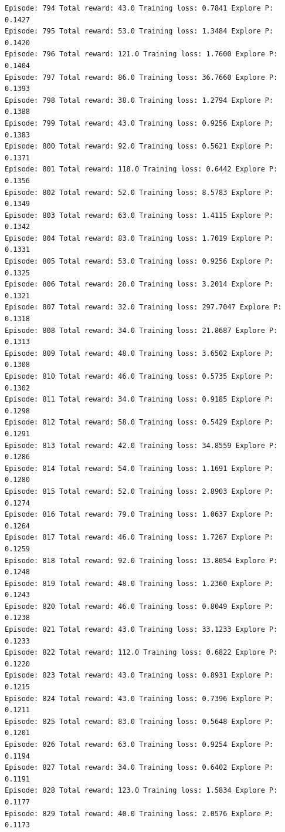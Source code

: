 \documentclass[11pt]{article}
\begin{document}
\begin{Verbatim}[commandchars=\\\{\}]
Episode: 794 Total reward: 43.0 Training loss: 0.7841 Explore P: 0.1427
Episode: 795 Total reward: 53.0 Training loss: 1.3484 Explore P: 0.1420
Episode: 796 Total reward: 121.0 Training loss: 1.7600 Explore P: 0.1404
Episode: 797 Total reward: 86.0 Training loss: 36.7660 Explore P: 0.1393
Episode: 798 Total reward: 38.0 Training loss: 1.2794 Explore P: 0.1388
Episode: 799 Total reward: 43.0 Training loss: 0.9256 Explore P: 0.1383
Episode: 800 Total reward: 92.0 Training loss: 0.5621 Explore P: 0.1371
Episode: 801 Total reward: 118.0 Training loss: 0.6442 Explore P: 0.1356
Episode: 802 Total reward: 52.0 Training loss: 8.5783 Explore P: 0.1349
Episode: 803 Total reward: 63.0 Training loss: 1.4115 Explore P: 0.1342
Episode: 804 Total reward: 83.0 Training loss: 1.7019 Explore P: 0.1331
Episode: 805 Total reward: 53.0 Training loss: 0.9256 Explore P: 0.1325
Episode: 806 Total reward: 28.0 Training loss: 3.2014 Explore P: 0.1321
Episode: 807 Total reward: 32.0 Training loss: 297.7047 Explore P: 0.1318
Episode: 808 Total reward: 34.0 Training loss: 21.8687 Explore P: 0.1313
Episode: 809 Total reward: 48.0 Training loss: 3.6502 Explore P: 0.1308
Episode: 810 Total reward: 46.0 Training loss: 0.5735 Explore P: 0.1302
Episode: 811 Total reward: 34.0 Training loss: 0.9185 Explore P: 0.1298
Episode: 812 Total reward: 58.0 Training loss: 0.5429 Explore P: 0.1291
Episode: 813 Total reward: 42.0 Training loss: 34.8559 Explore P: 0.1286
Episode: 814 Total reward: 54.0 Training loss: 1.1691 Explore P: 0.1280
Episode: 815 Total reward: 52.0 Training loss: 2.8903 Explore P: 0.1274
Episode: 816 Total reward: 79.0 Training loss: 1.0637 Explore P: 0.1264
Episode: 817 Total reward: 46.0 Training loss: 1.7267 Explore P: 0.1259
Episode: 818 Total reward: 92.0 Training loss: 13.8054 Explore P: 0.1248
Episode: 819 Total reward: 48.0 Training loss: 1.2360 Explore P: 0.1243
Episode: 820 Total reward: 46.0 Training loss: 0.8049 Explore P: 0.1238
Episode: 821 Total reward: 43.0 Training loss: 33.1233 Explore P: 0.1233
Episode: 822 Total reward: 112.0 Training loss: 0.6822 Explore P: 0.1220
Episode: 823 Total reward: 43.0 Training loss: 0.8931 Explore P: 0.1215
Episode: 824 Total reward: 43.0 Training loss: 0.7396 Explore P: 0.1211
Episode: 825 Total reward: 83.0 Training loss: 0.5648 Explore P: 0.1201
Episode: 826 Total reward: 63.0 Training loss: 0.9254 Explore P: 0.1194
Episode: 827 Total reward: 34.0 Training loss: 0.6402 Explore P: 0.1191
Episode: 828 Total reward: 123.0 Training loss: 1.5834 Explore P: 0.1177
Episode: 829 Total reward: 40.0 Training loss: 2.0576 Explore P: 0.1173

\end{Verbatim}
\end{document}
